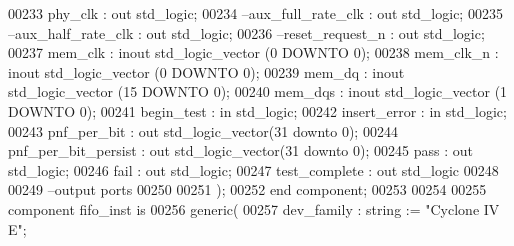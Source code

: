 \begin{DoxyCode}
00233         phy_clk             : \textcolor{keywordflow}{out} \textcolor{comment}{std\_logic};
00234 \textcolor{keyword}{        --aux\_full\_rate\_clk : out std\_logic;}
00235 \textcolor{keyword}{        --aux\_half\_rate\_clk : out std\_logic;}
00236 \textcolor{keyword}{        --reset\_request\_n   : out std\_logic;}
00237         mem_clk             : \textcolor{keywordflow}{inout} \textcolor{comment}{std\_logic\_vector} (\textcolor{vhdllogic}{}\textcolor{vhdllogic}{0} \textcolor{keywordflow}{DOWNTO} \textcolor{vhdllogic}{}\textcolor{vhdllogic}{0});
00238         mem_clk_n           : \textcolor{keywordflow}{inout} \textcolor{comment}{std\_logic\_vector} (\textcolor{vhdllogic}{}\textcolor{vhdllogic}{0} \textcolor{keywordflow}{DOWNTO} \textcolor{vhdllogic}{}\textcolor{vhdllogic}{0});
00239         mem_dq              : \textcolor{keywordflow}{inout} \textcolor{comment}{std\_logic\_vector} (\textcolor{vhdllogic}{}\textcolor{vhdllogic}{15} \textcolor{keywordflow}{DOWNTO} \textcolor{vhdllogic}{}\textcolor{vhdllogic}{0});
00240         mem_dqs             : \textcolor{keywordflow}{inout} \textcolor{comment}{std\_logic\_vector} (\textcolor{vhdllogic}{}\textcolor{vhdllogic}{1} \textcolor{keywordflow}{DOWNTO} \textcolor{vhdllogic}{}\textcolor{vhdllogic}{0});
00241         begin_test              : \textcolor{keywordflow}{in} \textcolor{comment}{std\_logic};
00242         insert_error            : \textcolor{keywordflow}{in} \textcolor{comment}{std\_logic};
00243         pnf_per_bit             : \textcolor{keywordflow}{out} \textcolor{comment}{std\_logic\_vector}(\textcolor{vhdllogic}{}\textcolor{vhdllogic}{31} \textcolor{keywordflow}{downto} \textcolor{vhdllogic}{}\textcolor{vhdllogic}{0});
00244         pnf_per_bit_persist     : \textcolor{keywordflow}{out} \textcolor{comment}{std\_logic\_vector}(\textcolor{vhdllogic}{}\textcolor{vhdllogic}{31} \textcolor{keywordflow}{downto} \textcolor{vhdllogic}{}\textcolor{vhdllogic}{0});
00245         pass                    : \textcolor{keywordflow}{out} \textcolor{comment}{std\_logic};
00246         fail                    : \textcolor{keywordflow}{out} \textcolor{comment}{std\_logic}; 
00247         test_complete           : \textcolor{keywordflow}{out} \textcolor{comment}{std\_logic}
00248 
00249 \textcolor{keyword}{      --output ports }
00250         
00251         );
00252 \textcolor{keywordflow}{end} \textcolor{keywordflow}{component};
00253 
00254 
00255 \textcolor{keywordflow}{component}  fifo_inst \textcolor{keywordflow}{is}
00256   \textcolor{keywordflow}{generic}(
00257         dev_family          : \textcolor{comment}{string}  := \textcolor{keyword}{"Cyclone IV E"};

\end{DoxyCode}
